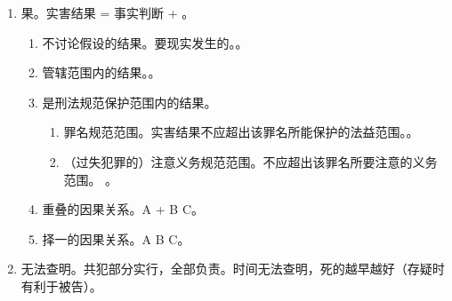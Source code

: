 \begin{enumerate}
\begin{enumerate}
\begin{enumerate}
                \end{enumerate}
          \item {}。结论。先行行为对疾病的发作则有因果关系。。
          \item 第三人行为。
                \begin{enumerate}
                  \item {}。结论。如果救助行为有救活可能性，结果就算到阻断行为上。
                        \begin{enumerate}
                          \item {}。
                          \item {}。
                          \item {}。
                        \end{enumerate}
                \end{enumerate}
        \end{enumerate}
  \item 果。实害结果 = 事实判断 + 。
        \begin{enumerate}
          \item 不讨论假设的结果。要现实发生的。。
          \item 管辖范围内的结果。。
          \item 是刑法规范保护范围内的结果。
                \begin{enumerate}
                  \item 罪名规范范围。实害结果不应超出该罪名所能保护的法益范围。。
                  \item （过失犯罪的）注意义务规范范围。不应超出该罪名所要注意的义务范围。
                        。
                \end{enumerate}
          \item 重叠的因果关系。A + B \yjt C。
          \item 择一的因果关系。A \hz B \yjt C。
        \end{enumerate}
  \item 无法查明。共犯部分实行，全部负责。时间无法查明，死的越早越好（存疑时有利于被告）。
\end{enumerate}
% 
